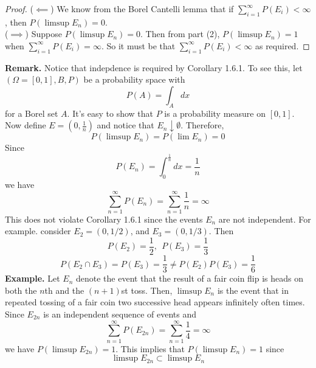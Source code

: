 \documentclass[openany]{report}
\begin{document}
\begin{proof}
    ($\impliedby$) We know from the Borel Cantelli lemma that if $\sum\limits_{i=1}^\infty P(E_i) < \infty$, then $P(\limsup E_n) = 0$.\\[1ex]
    ($\implies$) Suppose $P(\limsup E_n) = 0$. Then from part (2), $P(\limsup E_n) = 1$ when $\sum\limits_{i=1}^\infty P(E_i) = \infty$. So it must be that $\sum\limits_{i=1}^\infty P(E_i) < \infty$ as required. 
\end{proof}
\noindent
\textbf{Remark.} Notice that indepdence is required by Corollary 1.6.1. To see this, let $(\Omega = [0,1], B, P)$ be a probability space with 
\[P(A) = \int_A dx\]
for a Borel set $A$. It's easy to show that $P$ is a probability measure on $[0,1]$. Now define $E = \left(0, \frac{1}{n}\right)$ and notice that $E_n \downarrow \emptyset$. Therefore, 
\[P(\limsup E_n) = P(\lim E_n) = 0\]
Since 
\[P(E_n) = \int_0^\frac{1}{n} dx = \frac{1}{n}\]
we have 
\[\sum_{n=1}^\infty P(E_n) = \sum_{n=1}^\infty \frac{1}{n} = \infty\]
This does not violate Corollary 1.6.1 since the events $E_n$ are not independent. For example. consider $E_2 = (0,1/2)$, and $E_3 = (0,1/3)$. Then 
\[P(E_2) = \frac{1}{2}, \ \ P(E_3) = \frac{1}{3}\]
\[P(E_2 \cap E_3) = P(E_3) = \frac{1}{3} \neq P(E_2)P(E_3) = \frac{1}{6}\]
\textbf{Example.} Let $E_n$ denote the event that the result of a fair coin flip is heads on both the $n$th and the $(n + 1)$st toss. Then,
$\limsup E_n$ is the event that in repeated tossing of a fair coin two
successive head appears infinitely often times. Since ${E_{2n}}$ is an
independent sequence of events and
\[\sum_{n=1}^\infty P(E_{2n}) = \sum_{n=1}^\infty \frac{1}{4} = \infty\]
we have $P(\limsup E_{2n}) = 1$. This implies that $P(\limsup E_n) = 1$ since 
\[\limsup E_{2n} \subset \limsup E_n\]
\end{document}
